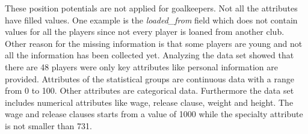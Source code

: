 These position potentials are not applied for goalkeepers.
Not all the attributes have filled values. One example is the \textit{loaded\_from} field which does not contain values for all the players since not every player is loaned from another club. Other reason for the missing information is that some players are young and not all the information has been collected yet. Analyzing the data set showed that there are 48 players were only key attributes like personal information are provided. \newline
Attributes of the statistical groups are continuous data with a range from 0 to 100. Other attributes are categorical data. Furthermore the data set includes numerical attributes like wage, release clause, weight and height. \newline
The wage and release clauses starts from a value of 1000 while the specialty attribute is not smaller than 731.